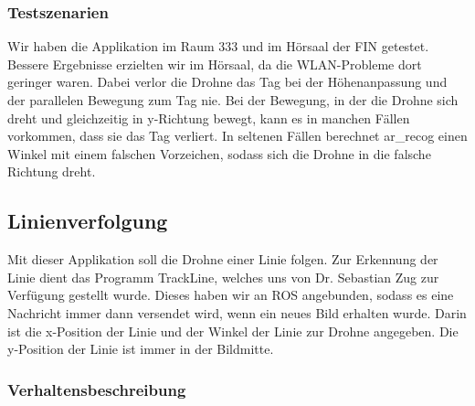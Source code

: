 \subsubsection*{Testszenarien }

Wir haben die Applikation im Raum 333 und im Hörsaal der FIN getestet. Bessere Ergebnisse erzielten wir im Hörsaal, da die WLAN-\/Probleme dort geringer waren. Dabei verlor die Drohne das Tag bei der Höhenanpassung und der parallelen Bewegung zum Tag nie. Bei der Bewegung, in der die Drohne sich dreht und gleichzeitig in y-\/Richtung bewegt, kann es in manchen Fällen vorkommen, dass sie das Tag verliert. In seltenen Fällen berechnet ar\_\-recog einen Winkel mit einem falschen Vorzeichen, sodass sich die Drohne in die falsche Richtung dreht.

\subsection*{Linienverfolgung }

Mit dieser Applikation soll die Drohne einer Linie folgen. Zur Erkennung der Linie dient das Programm TrackLine, welches uns von Dr. Sebastian Zug zur Verfügung gestellt wurde. Dieses haben wir an ROS angebunden, sodass es eine Nachricht immer dann versendet wird, wenn ein neues Bild erhalten wurde. Darin ist die x-\/Position der Linie und der Winkel der Linie zur Drohne angegeben. Die y-\/Position der Linie ist immer in der Bildmitte.

\subsubsection*{Verhaltensbeschreibung }

